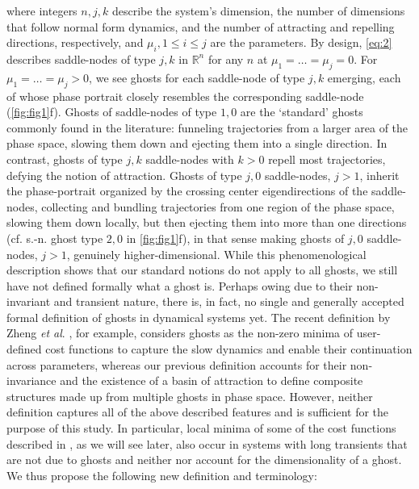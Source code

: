 \documentclass{article}
\theoremstyle{definition}
\begin{document}
\begin{refsection}
where integers $n,j,k$ describe the system's dimension, the number of dimensions that follow normal form dynamics, and the number of attracting and repelling directions, respectively, and $\mu_i, 1\leq i \leq j$ are the parameters. By design, \autoref{eq:2} describes saddle-nodes of type $j,k$ in $\mathbb{R}^n$ for any $n$ at $\mu_1=\dots=\mu_j=0$. %
For $\mu_1=\dots=\mu_j>0$, we see ghosts for each saddle-node of type $j,k$ emerging, each of whose phase portrait closely resembles the corresponding saddle-node (\autoref{fig:fig1}f). Ghosts of saddle-nodes of type $1,0$ are the `standard' ghosts commonly found in the literature: funneling trajectories from a larger area of the phase space, slowing them down and ejecting them into a single direction. In contrast, ghosts of type $j,k$ saddle-nodes with $k>0$ repell most trajectories, defying the notion of attraction. Ghosts of type $j,0$ saddle-nodes, $j>1$, inherit the phase-portrait organized by the crossing center eigendirections of the saddle-nodes, collecting and bundling trajectories from one region of the phase space, slowing them down locally, but then ejecting them into more than one directions (cf. s.-n. ghost type $2,0$ in \autoref{fig:fig1}f), in that sense making ghosts of $j,0$ saddle-nodes, $j>1$, genuinely higher-dimensional. While this phenomenological description shows that our standard notions do not apply to all ghosts, we still have not defined formally what a ghost is. Perhaps owing due to their non-invariant and transient nature, there is, in fact, no single and generally accepted formal definition of ghosts in dynamical systems yet. The recent definition by Zheng \textit{et al}. \cite{Zheng2025}, for example, considers ghosts as the non-zero minima of user-defined cost functions to capture the slow dynamics and enable their continuation across parameters, whereas our previous definition \cite{Koch_2024} accounts for their non-invariance and the existence of a basin of attraction to define composite structures made up from multiple ghosts in phase space. However, neither definition captures all of the above described features and is sufficient for the purpose of this study. In particular, local minima of some of the cost functions described in \cite{Zheng2025}, as we will see later, also occur in systems with long transients that are not due to ghosts and neither \cite{Zheng2025} nor \cite{Koch_2024} account for the dimensionality of a ghost. We thus propose the following new definition and terminology:


\end{refsection}
\end{document}
